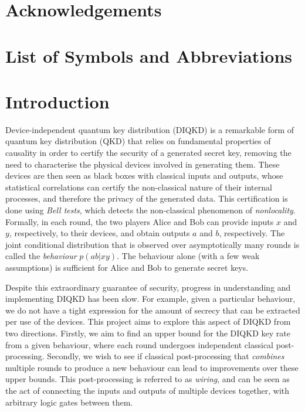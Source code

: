 \documentclass[10pt, a4paper]{article}
\numberwithin{equation}{section} %
\theoremstyle{definition}
\theoremstyle{plain}
\newcommand{\?}{\mathrel{?}} %
\begin{document}
  \section*{Acknowledgements}
  \clearpage

  \tableofcontents
  \clearpage

  \listoffigures
  \clearpage

  \listoftables
  \clearpage

  \section*{List of Symbols and Abbreviations}
  \clearpage

  \section{Introduction}

  Device-independent quantum key distribution (DIQKD) is a remarkable form of quantum key distribution (QKD) that relies on fundamental properties of causality in order to certify the security of a generated secret key, removing the need to characterise the physical devices involved in generating them. These devices are then seen as black boxes with classical inputs and outputs, whose statistical correlations can certify the non-classical nature of their internal processes, and therefore the privacy of the generated data. This certification is done using \emph{Bell tests}, which detects the non-classical phenomenon of \emph{nonlocality}. Formally, in each round, the two players Alice and Bob can provide inputs \(x\) and \(y\), respectively, to their devices, and obtain outputs \(a\) and \(b\), respectively. The joint conditional distribution that is observed over asymptotically many rounds is called the \emph{behaviour} \(p(ab|xy)\). The behaviour alone (with a few weak assumptions) is sufficient for Alice and Bob to generate secret keys.

  Despite this extraordinary guarantee of security, progress in understanding and implementing DIQKD has been slow. For example, given a particular behaviour, we do not have a tight expression for the amount of secrecy that can be extracted per use of the devices. This project aims to explore this aspect of DIQKD from two directions. Firstly, we aim to find an upper bound for the DIQKD key rate from a given behaviour, where each round undergoes independent classical post-processing. Secondly, we wish to see if classical post-processing that \emph{combines} multiple rounds to produce a new behaviour can lead to improvements over these upper bounds. This post-processing is referred to as \emph{wiring}, and can be seen as the act of connecting the inputs and outputs of multiple devices together, with arbitrary logic gates between them.
\end{document}
